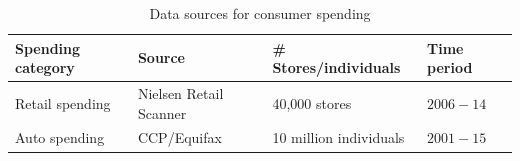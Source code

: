 \documentclass[\latexroot/\projectname]{subfiles}
\begin{document}
\begin{table}[h]
  \centering
  \caption{Data sources for consumer spending\whenintegrated{\label{tab:data-consumer-spending}}}
  \begin{tabular}{llll}
    \hline
    \textbf{Spending category} & \textbf{Source} & \textbf{\# Stores/individuals} & \textbf{Time period} \\
    \hline
    Retail spending & Nielsen Retail Scanner & 40,000 stores & $2006-14$ \\
    Auto spending & CCP/Equifax & 10 million individuals & $2001-15$ \\
    \hline
  \end{tabular}
\end{table}

\smartbib
\end{document}
